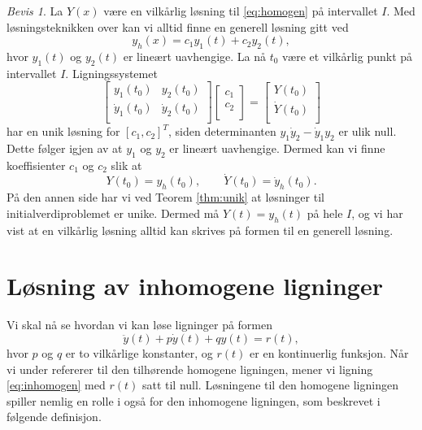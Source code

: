 \documentclass{article}
\theoremstyle{definition}
\theoremstyle{remark}
\newtheorem*{bevis}{Bevis}
\begin{document}
\begin{multicols*}{2}
\begin{bevis}
  La $Y(x)$ være en vilkårlig løsning til \eqref{eq:homogen} på intervallet $I$. Med løsningsteknikken over kan vi alltid finne en generell løsning gitt ved
  \begin{equation*}
    y_h(x) = c_1 y_1(t) + c_2 y_2(t),
  \end{equation*}
  hvor $y_1(t)$ og $y_2(t)$ er lineært uavhengige. La nå $t_0$ være et vilkårlig punkt på intervallet $I$. Ligningssystemet
  \begin{equation*}
    \begin{bmatrix}
      y_1(t_0) & y_2(t_0) \\
      \dot{y}_1(t_0) & \dot{y}_2(t_0) \\
    \end{bmatrix}
    \begin{bmatrix}
      c_1 \\
      c_2 \\
    \end{bmatrix}
    =
    \begin{bmatrix}
      Y(t_0) \\
      \dot{Y}(t_0) \\
    \end{bmatrix}
  \end{equation*}
  har en unik løsning for $[c_1, c_2]^T$, siden determinanten $y_1 \dot{y}_2 - \dot{y}_1 y_2$ er ulik null. Dette følger igjen av at $y_1$ og $y_2$ er lineært uavhengige. Dermed kan vi finne koeffisienter $c_1$ og $c_2$ slik at 
  \begin{equation*}
    Y(t_0) = y_h(t_0), \qquad \dot{Y}(t_0) = \dot{y}_h(t_0).
  \end{equation*}
  På den annen side har vi ved Teorem \ref{thm:unik} at løsninger til initialverdiproblemet er unike. Dermed må $Y(t) = y_h(t)$ på hele $I$, og vi har vist at en vilkårlig løsning alltid kan skrives på formen til en generell løsning.
\end{bevis}


\section*{Løsning av inhomogene ligninger}
Vi skal nå se hvordan vi kan løse ligninger på formen
\begin{equation} \label{eq:inhomogen}
    \ddot{y}(t) + p \dot{y}(t) + q y(t) = r(t),
\end{equation}
hvor $p$ og $q$ er to vilkårlige konstanter, og $r(t)$ er en kontinuerlig funksjon. Når vi under refererer til den tilhørende homogene ligningen, mener vi ligning \eqref{eq:inhomogen} med $r(t)$ satt til null. Løsningene til den homogene ligningen spiller nemlig en rolle i også for den inhomogene ligningen, som beskrevet i følgende definisjon.


\end{multicols*}
\end{document}
